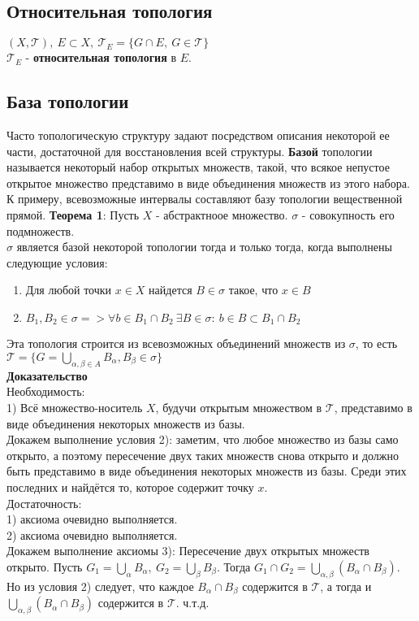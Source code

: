 \subsection{Относительная топология}
$(X, \mathcal{T}), \ E \subset X, \ \mathcal{T}_E = \{G \cap E, \ G \in \mathcal{T}\}$
\\
$\mathcal{T}_E$ - \textbf{относительная топология} в $E$.
\subsection{База топологии}
Часто топологическую структуру задают посредством описания 
некоторой ее части, достаточной для восстановления всей структуры.
\textbf{Базой} топологии называется некоторый набор открытых множеств,
такой, что всякое непустое открытое множество представимо в виде
объединения множеств из этого набора. К примеру, всевозможные интервалы
составляют базу топологии вещественной прямой.
\newpage
\textbf{Теорема 1}: Пусть $X$ - абстрактноое множество. $\sigma$ - совокупность 
его подмножеств.
\\
$\sigma$ является базой некоторой топологии тогда и только тогда, когда 
выполнены следующие условия: 
\begin{enumerate}
    \item Для любой точки $x \in X$ найдется $B \in \sigma$ такое, что $x \in B$
    \item $B_1, B_2 \in \sigma => \forall b \in B_1 \cap B_2 \ \exists
    B \in \sigma: \ b \in B \subset B_1 \cap B_2$
\end{enumerate}
Эта топология строится из всевозможных объединений 
множеств из $\sigma$, то есть \\
$\mathcal{T} = \{G=\bigcup\limits_{\alpha, \beta \in A}B_\alpha, B_\beta \in \sigma\}$
\\
\textbf{Доказательство} \\
Необходимость: \\
1) Всё множество-носитель $X$, будучи открытым множеством в $\mathcal{T}$, представимо 
в виде объединения некоторых множеств из базы. \\
Докажем выполнение условия 2): заметим, что любое множество 
из базы само открыто, а поэтому пересечение двух таких 
множеств снова открыто и должно быть представимо в виде
объединения некоторых множеств из базы. Среди этих последних
и найдётся то, которое содержит точку $x$.
\\
Достаточность: \\
1) аксиома очевидно выполняется. \\
2) аксиома очевидно выполняется.  \\
Докажем выполнение аксиомы 3): Пересечение двух открытых множеств открыто.
Пусть $G_1 = \bigcup\limits_\alpha B_\alpha, \ 
G_2 = \bigcup\limits_\beta B_\beta$. Тогда $G_1 \cap G_2 = \bigcup\limits_{\alpha, \beta}(B_\alpha \cap B_\beta)$.
Но из условия 2) следует, что каждое $B_\alpha \cap B_\beta$ содержится в $\mathcal{T}$, а тогда и $\bigcup\limits_{\alpha, \beta}(B_\alpha \cap B_\beta)$
содержится в $\mathcal{T}$. ч.т.д.
